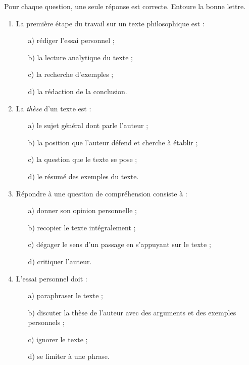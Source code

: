 \documentclass[11pt]{article}
\begin{document}
\begin{exercice}
Pour chaque question, une seule réponse est correcte. Entoure la bonne lettre.
\begin{enumerate}
\item La première étape du travail sur un texte philosophique est :
\begin{enumerate}
\item[a)] rédiger l'essai personnel ;
\item[b)] la lecture analytique du texte ;
\item[c)] la recherche d'exemples ;
\item[d)] la rédaction de la conclusion.
\end{enumerate}
\item La \emph{thèse} d'un texte est :
\begin{enumerate}
\item[a)] le sujet général dont parle l'auteur ;
\item[b)] la position que l'auteur défend et cherche à établir ;
\item[c)] la question que le texte se pose ;
\item[d)] le résumé des exemples du texte.
\end{enumerate}
\item Répondre à une question de compréhension consiste à :
\begin{enumerate}
\item[a)] donner son opinion personnelle ;
\item[b)] recopier le texte intégralement ;
\item[c)] dégager le sens d'un passage en s'appuyant sur le texte ;
\item[d)] critiquer l'auteur.
\end{enumerate}
\item L'essai personnel doit :
\begin{enumerate}
\item[a)] paraphraser le texte ;
\item[b)] discuter la thèse de l'auteur avec des arguments et des exemples personnels ;
\item[c)] ignorer le texte ;
\item[d)] se limiter à une phrase.
\end{enumerate}
\end{enumerate}
\end{exercice}
\end{document}
